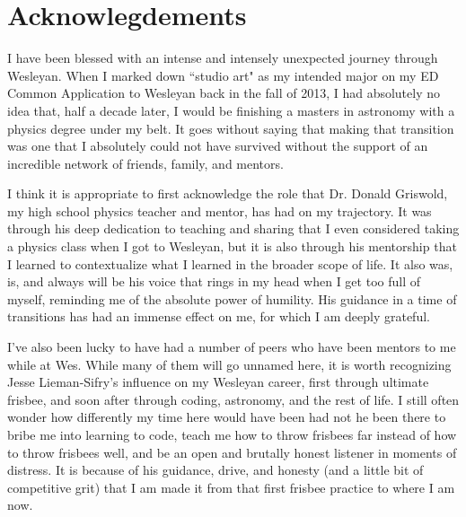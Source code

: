 \chapter{Acknowlegdements}

I have been blessed with an intense and intensely unexpected journey through Wesleyan. When I marked down ``studio art" as my intended major on my ED Common Application to Wesleyan back in the fall of 2013, I had absolutely no idea that, half a decade later, I would be finishing a masters in astronomy with a physics degree under my belt. It goes without saying that making that transition was one that I absolutely could not have survived without the support of an incredible network of friends, family, and mentors.

I think it is appropriate to first acknowledge the role that Dr. Donald Griswold, my high school physics teacher and mentor, has had on my trajectory. It was through his deep dedication to teaching and sharing that I even considered taking a physics class when I got to Wesleyan, but it is also through his mentorship that I learned to contextualize what I learned in the broader scope of life. It also was, is, and always will be his voice that rings in my head when I get too full of myself, reminding me of the absolute power of humility. His guidance in a time of transitions has had an immense effect on me, for which I am deeply grateful.


I've also been lucky to have had a number of peers who have been mentors to me while at Wes. While many of them will go unnamed here, it is worth recognizing Jesse Lieman-Sifry's influence on my Wesleyan career, first through ultimate frisbee, and soon after through coding, astronomy, and the rest of life. I still often wonder how differently my time here would have been had not he been there to bribe me into learning to code, teach me how to throw frisbees far instead of how to throw frisbees well, and be an open and brutally honest listener in moments of distress. It is because of his guidance, drive, and honesty (and a little bit of competitive grit) that I am made it from that first frisbee practice to where I am now.


